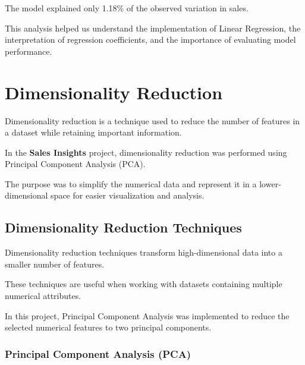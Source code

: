 \documentclass[12pt,a4paper]{report}
\begin{document}
The model explained only 1.18\%
of the observed variation in sales.

This analysis helped us understand
the implementation of Linear Regression,
the interpretation of regression
coefficients, and the importance
of evaluating model performance.

\endgroup



\chapter{Dimensionality Reduction}

\begingroup
\fontsize{14}{21}\selectfont

Dimensionality reduction is a technique
used to reduce the number of features
in a dataset while retaining important
information.

In the \textbf{Sales Insights} project,
dimensionality reduction was performed
using Principal Component Analysis (PCA).

The purpose was to simplify the numerical
data and represent it in a lower-dimensional
space for easier visualization and analysis.


\section{Dimensionality Reduction Techniques}

Dimensionality reduction techniques
transform high-dimensional data into
a smaller number of features.

These techniques are useful when
working with datasets containing
multiple numerical attributes.

In this project, Principal Component
Analysis was implemented to reduce
the selected numerical features
to two principal components.


\subsection{Principal Component Analysis (PCA)}
\end{document}
